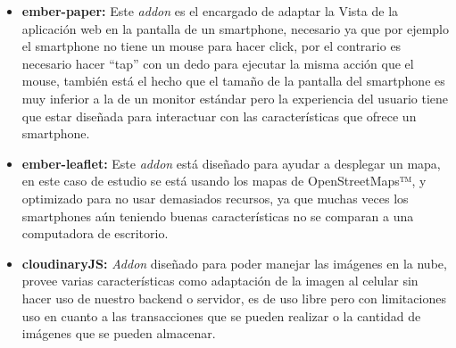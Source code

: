 \begin{itemize}
\item \textbf{ember-paper:} Este \emph{addon} es el encargado de adaptar la Vista de la aplicación web en la pantalla de un smartphone, necesario ya que por ejemplo el smartphone no tiene un mouse para hacer click, por el contrario es necesario hacer “tap” con un dedo para ejecutar la misma acción que el mouse, también está el hecho que el tamaño de la pantalla del smartphone es muy inferior a la de un monitor estándar pero la experiencia del usuario tiene que estar diseñada para interactuar con las características que ofrece un smartphone.

\item \textbf{ember-leaflet:} Este \emph{addon} está diseñado para ayudar a desplegar un mapa, en este caso de estudio se está usando los mapas de OpenStreetMaps™, y optimizado para no usar demasiados recursos, ya que muchas veces los smartphones aún teniendo buenas características no se comparan a una computadora de escritorio.

\item \textbf{cloudinaryJS:} \emph{Addon} diseñado para poder manejar las imágenes en la nube, provee varias características como adaptación de la imagen al celular sin hacer uso de nuestro backend o servidor, es de uso libre pero con limitaciones uso en cuanto a las transacciones que se pueden realizar o la cantidad de imágenes que se pueden almacenar.

\end{itemize}



